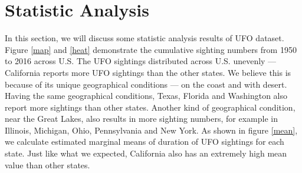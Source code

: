 \section{Statistic Analysis}\label{statistic}
In this section, we will discuss some statistic analysis results of UFO dataset. Figure \ref{map} and \ref{heat} demonstrate the cumulative sighting numbers from 1950 to 2016 across U.S. The UFO sightings distributed across U.S. unevenly --- California reports more UFO sightings than the other states. We believe this is because of its unique geographical conditions --- on the coast and with desert. Having the same geographical conditions, Texas, Florida and Washington also report more sightings than other states. Another kind of geographical condition, near the Great Lakes, also results in more sighting numbers, for example in Illinois, Michigan, Ohio, Pennsylvania and New York. As shown in figure \ref{mean}, we calculate estimated marginal means of duration of UFO sightings for each state. Just like what we expected, California also has an extremely high mean value than other states. 

